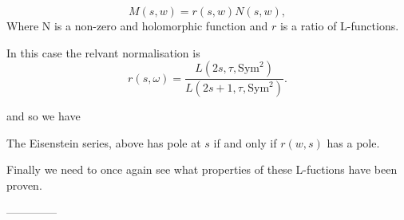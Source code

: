     \begin{Theorem}
    \[M(s, w) = r(s,w)N(s,w),\]
    Where N is a non-zero and holomorphic function and \(r\) is a ratio of L-functions.
    \end{Theorem} 

    In this case the relvant normalisation is \cite[Eq. 1.5]{ginzburgTopFourierCoefficients2021}
    \[r(s,\omega) = \frac{ L(2s, \tau, \mathrm{Sym}^2)}{L(2s+1, \tau, \mathrm{Sym}^2)} .\]

    and so we have
    \begin{Lemma}
        The Eisenstein series,  above has pole at \(s\) if and only if \(r(w,s)\) has a pole.
     \end{Lemma}
     Finally we need to once again see what properties of these L-fuctions have been proven. 

    --------------

     \begin{Theorem}
        
     \end{Theorem}

